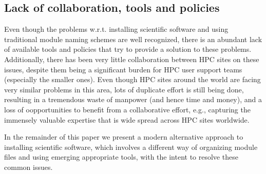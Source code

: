 \subsection{Lack of collaboration, tools and policies}
\label{sec:traditional_lack}

Even though the problems w.r.t. installing scientific software and using
traditional module naming schemes are well recognized, there is an abundant lack
of available tools and policies that try to provide a solution to these problems.
Additionally, there has been very little collaboration between HPC sites on these
issues, despite them being a significant burden for HPC user support teams
(especially the smaller ones). Even though HPC sites around the world are facing
very similar problems in this area, lots of duplicate effort is still being done,
resulting in a tremendous waste of manpower (and hence time and money), and a loss
of oopportunities to benefit from a collaborative effort, e.g., capturing the
immensely valuable expertise that is wide spread across HPC sites worldwide.

In the remainder of this paper we present a modern alternative approach to
installing scientific software, which involves a different way of organizing
module files and using emerging appropriate tools, with the intent to resolve
these common issues.


